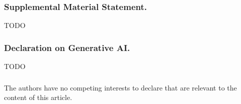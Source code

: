 \begin{credits}
\ifanonymous\else
\subsubsection{\ackname}
\fi

\subsubsection{Supplemental Material Statement.}
TODO

\subsubsection{Declaration on Generative AI.}
TODO

\subsubsection{\discintname}
The authors have no competing interests to declare that are relevant to the
content of this article.
\end{credits}
